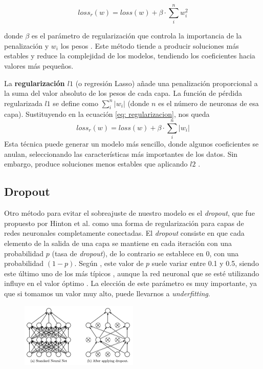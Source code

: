\begin{equation}
loss_{r}(w) = loss(w) + \beta \cdot \sum_{i}^n w_i^2
\end{equation}

donde \(\beta\) es el parámetro de regularización que controla la importancia de la penalización y $w_i$ los pesos \citep{geron2022hands}. Este método tiende a producir soluciones más estables y reduce la complejidad de los modelos, tendiendo los coeficientes hacia valores más pequeños.


La \textbf{regularización \(l1\)} (o regresión Lasso) añade una penalización proporcional a la suma del valor absoluto de los pesos de cada capa. La función de pérdida regularizada \(l1\) se define como $\sum_{i}^n |w_i|$ (donde $n$ es el número de neuronas de esa capa). Sustituyendo en la ecuación \ref{eq: regularizacion}, nos queda
\begin{equation}
loss_{r}(w) = loss(w) + \beta \cdot \sum_{i}^n |w_i|
\end{equation}
Esta técnica puede generar un modelo más sencillo, donde algunos coeficientes se anulan, seleccionando las características más importantes de los datos. Sin embargo, produce soluciones menos estables que aplicando $l2$ \citep{geron2022hands}. 


\subsection{Dropout} \label{sec:dropout}

Otro método para evitar el sobreajuste de nuestro modelo es el \textit{dropout}, que fue propuesto por Hinton et al. \citep{hinton2012improving} como una forma de regularización para capas de redes neuronales completamente conectadas. El \textit{dropout} consiste en que cada elemento de la salida de una capa se mantiene en cada iteración con una probabilidad \(p\) (tasa de \textit{dropout}), de lo contrario se establece en 0, con una probabilidad \((1 - p)\). Según \citep{geron2022hands}, este valor de $p$ suele variar entre 0.1 y 0.5, siendo este último uno de los más típicos \citep{srivastava2013improving}, aunque la red neuronal que se esté utilizando influye en el valor óptimo \citep{geron2022hands}. La elección de este parámetro es muy importante, ya que si tomamos un valor muy alto, puede llevarnos a \textit{underfitting}.
    
\begin{figure}[H]
    \centering
    \includegraphics[width=0.5\textwidth]{img/dropout.png}
    \label{fig:dropout}
\end{figure}
    
